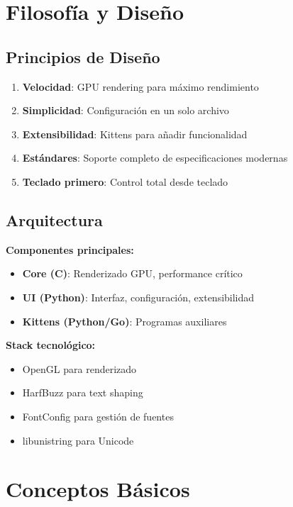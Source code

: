 \documentclass[
  doc,
  floatsintext,
  longtable,
  a4paper,
  nolmodern,
  notxfonts,
  notimes,
  12pt,
  colorlinks=true,linkcolor=blue,citecolor=blue,urlcolor=blue]{apa7}
\providecommand{\tightlist}{%
  \setlength{\itemsep}{0pt}\setlength{\parskip}{0pt}}
\begin{document}
\section{Filosofía y Diseño}\label{filosofuxeda-y-diseuxf1o}

\subsection{Principios de Diseño}\label{principios-de-diseuxf1o}

\begin{enumerate}
\def\labelenumi{\arabic{enumi}.}
\tightlist
\item
  \textbf{Velocidad}: GPU rendering para máximo rendimiento
\item
  \textbf{Simplicidad}: Configuración en un solo archivo
\item
  \textbf{Extensibilidad}: Kittens para añadir funcionalidad
\item
  \textbf{Estándares}: Soporte completo de especificaciones modernas
\item
  \textbf{Teclado primero}: Control total desde teclado
\end{enumerate}

\subsection{Arquitectura}\label{arquitectura}

\textbf{Componentes principales:}

\begin{itemize}
\tightlist
\item
  \textbf{Core (C)}: Renderizado GPU, performance crítico
\item
  \textbf{UI (Python)}: Interfaz, configuración, extensibilidad
\item
  \textbf{Kittens (Python/Go)}: Programas auxiliares
\end{itemize}

\textbf{Stack tecnológico:}

\begin{itemize}
\tightlist
\item
  OpenGL para renderizado
\item
  HarfBuzz para text shaping
\item
  FontConfig para gestión de fuentes
\item
  libunistring para Unicode
\end{itemize}

\section{Conceptos Básicos}\label{conceptos-buxe1sicos}
\end{document}
